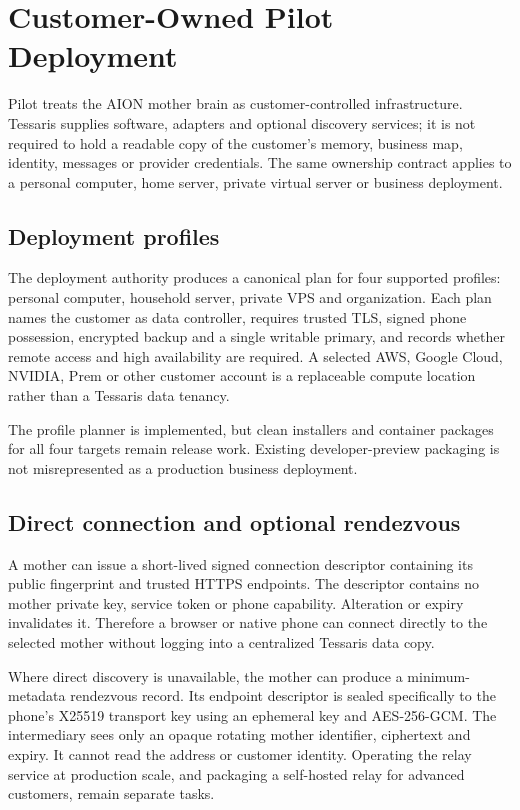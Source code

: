 \section{Customer-Owned Pilot Deployment}
\label{sec:pilot-mobile-self-hosting}

Pilot treats the AION mother brain as customer-controlled infrastructure.  Tessaris
supplies software, adapters and optional discovery services; it is not required to
hold a readable copy of the customer's memory, business map, identity, messages or
provider credentials.  The same ownership contract applies to a personal computer,
home server, private virtual server or business deployment.

\subsection{Deployment profiles}

The deployment authority produces a canonical plan for four supported profiles:
personal computer, household server, private VPS and organization.  Each plan names
the customer as data controller, requires trusted TLS, signed phone possession,
encrypted backup and a single writable primary, and records whether remote access
and high availability are required.  A selected AWS, Google Cloud, NVIDIA, Prem or
other customer account is a replaceable compute location rather than a Tessaris
data tenancy.

The profile planner is implemented, but clean installers and container packages for
all four targets remain release work.  Existing developer-preview packaging is not
misrepresented as a production business deployment.

\subsection{Direct connection and optional rendezvous}

A mother can issue a short-lived signed connection descriptor containing its public
fingerprint and trusted HTTPS endpoints.  The descriptor contains no mother private
key, service token or phone capability.  Alteration or expiry invalidates it.
Therefore a browser or native phone can connect directly to the selected mother
without logging into a centralized Tessaris data copy.

Where direct discovery is unavailable, the mother can produce a minimum-metadata
rendezvous record.  Its endpoint descriptor is sealed specifically to the phone's
X25519 transport key using an ephemeral key and AES-256-GCM.  The intermediary sees
only an opaque rotating mother identifier, ciphertext and expiry.  It cannot read
the address or customer identity.  Operating the relay service at production scale,
and packaging a self-hosted relay for advanced customers, remain separate tasks.

